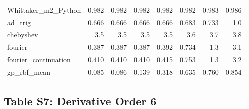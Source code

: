 \begin{longtable}{lrrrrrrr}
Whittaker\_m2\_Python & 0.982 & 0.982 & 0.982 & 0.982 & 0.982 & 0.983 & 0.986 \\
ad\_trig & 0.666 & 0.666 & 0.666 & 0.666 & 0.683 & 0.733 & 1.0 \\
chebyshev & 3.5 & 3.5 & 3.5 & 3.5 & 3.6 & 3.7 & 3.8 \\
fourier & 0.387 & 0.387 & 0.387 & 0.392 & 0.734 & 1.3 & 3.1 \\
fourier\_continuation & 0.410 & 0.410 & 0.410 & 0.415 & 0.753 & 1.3 & 3.2 \\
gp\_rbf\_mean & 0.085 & 0.086 & 0.139 & 0.318 & 0.635 & 0.760 & 0.854 \\
\bottomrule
\end{longtable}

\clearpage

\subsection*{Table S7: Derivative Order 6}

